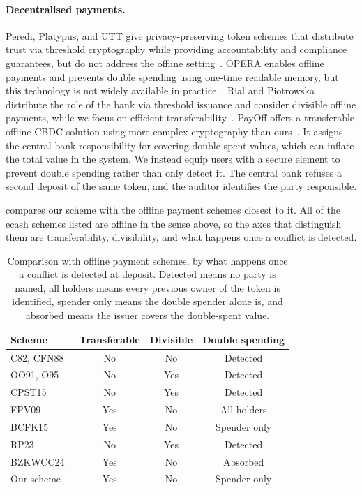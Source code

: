 \paragraph{Decentralised payments.} Peredi, Platypus, and UTT give
privacy-preserving token schemes that distribute trust via threshold
cryptography while providing accountability and compliance guarantees, but do
not address the offline
setting~\cite{CCS:KiaKohSar22,CCS:WKDC22,EPRINT:TBAAGP22}. OPERA enables
offline payments and prevents double spending using one-time readable memory,
but this technology is not widely available in practice~\cite{park2017opera}.
Rial and Piotrowska distribute the role of the bank via threshold issuance and
consider divisible offline payments, while we focus on efficient
transferability~\cite{PoPETS:RiaPio23}. PayOff offers a transferable offline
CBDC solution using more complex cryptography than ours~\cite{Beer2024}. It
assigns the central bank responsibility for covering double-spent values, which
can inflate the total value in the system. We instead equip users with a secure
element to prevent double spending rather than only detect it. The central bank
refuses a second deposit of the same token, and the auditor identifies the
party responsible.

 compares our scheme with the offline
payment schemes closest to it. All of the ecash schemes listed are offline in
the sense above, so the axes that distinguish them are transferability,
divisibility, and what happens once a conflict is detected.

\begin{table}[htbp] \centering \small
%
  \begin{tabular}{lccc}
%
    \toprule Scheme & Transferable & Divisible & Double spending \\ \midrule
    C82, CFN88~\cite{C:Chaum82,C:ChaFiaNao88} & No & No & Detected \\
%
    OO91, O95~\cite{C:OkaOht91,C:Okamoto95} & No & Yes & Detected \\
%
    CPST15~\cite{PKC:CPST15,ACNS:CPST15} & No & Yes & Detected \\
%
    FPV09~\cite{CANS:FucPoiVer09} & Yes & No & All holders \\
%
    BCFK15~\cite{PKC:BCFK15} & Yes & No & Spender only \\
%
    RP23~\cite{PoPETS:RiaPio23} & No & Yes & Detected \\
%
    BZKWCC24~\cite{Beer2024} & Yes & No & Absorbed \\
%
    Our scheme & Yes & No & Spender only \\ \bottomrule
%
  \end{tabular}
%
  \caption[Comparison with offline payment schemes]{Comparison with
    offline payment schemes, by what happens once a conflict is detected at
    deposit. Detected means no party is named, all holders means every previous
    owner of the token is identified, spender only means the double spender
    alone is, and absorbed means the issuer covers the double-spent value.}
\label{tab:offline-related-comparison} \end{table}

